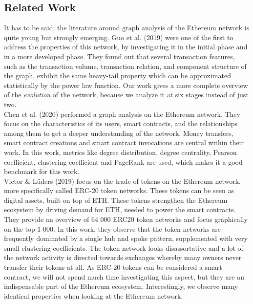 \documentclass[10pt,a4paper]{article}
\begin{document}
\begin{multicols}{2}
\section{Related Work}
It has to be said: the literature around graph analysis of the Ethereum network is quite young but strongly emerging. Guo et al. (2019) \cite{GUO201958} were one of the first to address the properties of this network, by investigating it in the initial phase and in a more developed phase. They found out that several transaction features, such as the transaction volume, transaction relation, and component structure of the graph, exhibit the same heavy-tail property which can be approximated statistically by the power law function. Our work gives a more complete overview of the \textit{evolution} of the network, because we analyze it at six stages instead of just two.\\
Chen et al. (2020) \cite{chenEthereum} performed a graph analysis on the Ethereum network. They focus on the characteristics of its users, smart contracts, and the relationships among them to get a deeper understanding of the network. Money transfers, smart contract creations and smart contract invocations are central within their work. In this work, metrics like degree distribution, degree centrality, Pearson coefficient, clustering coefficient and PageRank are used, which makes it a good benchmark for this work.\\
Victor \& Lüders (2019) \cite{inbook} focus on the trade of tokens on the Ethereum network, more specifically called ERC-20 token networks. These tokens can be seen as digital assets, built on top of ETH. These tokens strengthen the Ethereum ecosystem by driving demand for ETH, needed to power the smart contracts. They provide an overview of 64 000 ERC20 token networks and focus graphically on the top 1 000. In this work, they observe that the token networks are frequently dominated by a single hub and spoke pattern, supplemented with very small clustering coefficients. The token network looks disassortative and a lot of the network activity is directed towards exchanges whereby many owners never transfer their tokens at all. As ERC-20 tokens can be considered a smart contract, we will not spend much time investigating this aspect, but they are an indispensable part of the Ethereum ecosystem. Interestingly, we observe many identical properties when looking at the Ethereum network.



\end{multicols}
\end{document}

